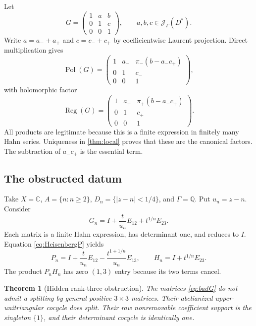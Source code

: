 \documentclass[11pt,letterpaper]{article}
\newtheorem{theorem}{Theorem}[section]
\theoremstyle{definition}
\theoremstyle{remark}
\newcommand{\C}{\mathbb C}
\newcommand{\Q}{\mathbb Q}
\newcommand{\JJ}{\mathscr J_\Gamma}
\newcommand{\Pol}{\operatorname{Pol}}
\newcommand{\Reg}{\operatorname{Reg}}
\numberwithin{equation}{section}
\begin{document}
Let
\[
 G=\begin{pmatrix}1&a&b\\0&1&c\\0&0&1\end{pmatrix},
 \qquad a,b,c\in\JJ(D^*).
\]
Write $a=a_-+a_+$ and $c=c_-+c_+$ by coefficientwise Laurent projection. Direct multiplication gives
\begin{equation}\label{eq:HeisenbergP}
 \Pol(G)=
 \begin{pmatrix}
  1&a_-&\pi_-(b-a_-c_+)\\
  0&1&c_-\\
  0&0&1
 \end{pmatrix},
\end{equation}
with holomorphic factor
\begin{equation}\label{eq:HeisenbergH}
 \Reg(G)=
 \begin{pmatrix}
  1&a_+&\pi_+(b-a_-c_+)\\
  0&1&c_+\\
  0&0&1
 \end{pmatrix}.
\end{equation}
All products are legitimate because this is a finite expression in finitely many Hahn series. Uniqueness in \cref{thm:local} proves that these are the canonical factors. The subtraction of $a_-c_+$ is the essential term.

\subsection{The obstructed datum}

Take $X=\C$, $A=\{n:n\geq2\}$, $D_n=\{|z-n|<1/4\}$, and $\Gamma=\Q$. Put $u_n=z-n$. Consider
\begin{equation}\label{eq:badG}
 G_n=I+\frac{t}{u_n}E_{12}+t^{1/n}E_{23}.
\end{equation}
Each matrix is a finite Hahn expression, has determinant one, and reduces to $I$. Equation \eqref{eq:HeisenbergP} yields
\begin{equation}\label{eq:badPH}
 P_n=I+\frac{t}{u_n}E_{12}-\frac{t^{1+1/n}}{u_n}E_{13},
 \qquad H_n=I+t^{1/n}E_{23}.
\end{equation}
The product $P_nH_n$ has zero $(1,3)$ entry because its two terms cancel.

\begin{theorem}[Hidden rank-three obstruction]\label{thm:hidden}
The matrices \eqref{eq:badG} do not admit a splitting by general positive $3\times3$ matrices. Their abelianized upper-unitriangular cocycle does split. Their raw nonremovable coefficient support is the singleton $\{1\}$, and their determinant cocycle is identically one.
\end{theorem}
\end{document}
